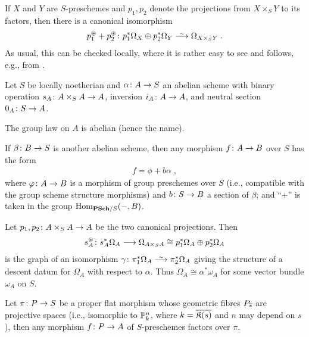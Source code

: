 \documentclass[a4paper,parskip=half,numbers=enddot, DIV=12]{scrreprt}
\begin{document}
If $X$ and $Y$ are $S$-preschemes and $p_1,p_2$ denote the projections from $X\times_SY$ to its factors, then there is a canonical isomorphism
\begin{align}\lbl{eq:p1p2Omega}
	p_1^\oast+p_2^\oast\colon p_1^*\Omega_X\oplus p_2^*\Omega_Y\isomorphism \Omega_{X\times_SY}\;.
\end{align}
As usual, this can be checked locally, where it is rather easy to see and follows, e.g., from \cite[Corollary~16.5]{eisenbudCommAlg}.
\begin{thm}
	Let $S$ be locally noetherian and $\alpha\colon A\morphism S$ an abelian scheme with binary operation $s_A\colon A\times_SA\morphism A$, inversion $i_A\colon A\morphism A$, and neutral section $0_A\colon S\morphism A$.
	\begin{alphanumerate}
		\item The group law on $A$ is abelian (hence the name).
		\item If $\beta\colon B\morphism S$ is another abelian scheme, then any morphism $f\colon A\morphism B$ over $S$ has the form
		\begin{align*}
			f=\phi+b\alpha\;,
		\end{align*}
		where $\phi\colon A\morphism B$ is a morphism of group preschemes over $S$ (i.e., compatible with the group scheme structure morphisms) and $b\colon S\morphism B$ a section of $\beta$; and ``$+$'' is taken in the group $\Hom_{\cat{PSch}/S}(-,B)$.
		\item Let $p_1,p_2\colon A\times_SA\morphism A$ be the two canonical projections. Then
		\begin{align*}
			s_A^\oast\colon s_A^*\Omega_A\morphism \Omega_{A\times_SA}\cong p_1^*\Omega_A\oplus p_2^*\Omega_A
		\end{align*}
		is the graph of an isomorphism $\gamma\colon \pi_1^*\Omega_A\isomorphism\pi_2^*\Omega_A$ giving the structure of a descent datum for $\Omega_A$ with respect to $\alpha$. Thus $\Omega_A\cong \alpha^*\omega_A$ for some vector bundle $\omega_A$ on $S$.
		\item Let $\pi\colon P\morphism S$ be a proper flat morphism whose geometric fibres $P_{\overline{s}}$ are projective spaces (i.e., isomorphic to $\mathbb{P}_k^n$, where $k=\overline{{\mathfrak{K}(s)}}$ and $n$ may depend on $s$), then any morphism $f\colon P\morphism A$ of $S$-preschemes factors over $\pi$.
	\end{alphanumerate}
\end{thm}
\end{document}
